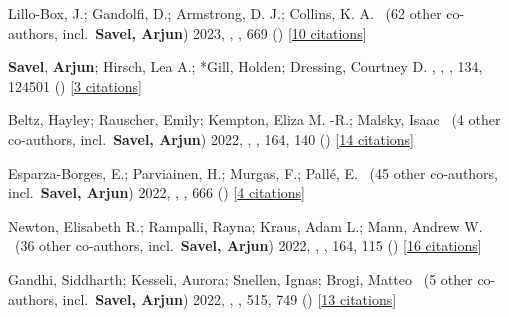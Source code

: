 \item[{\color{numcolor}\scriptsize19}] Lillo-Box, J.; Gandolfi, D.; Armstrong, D. J.; Collins, K. A. \etal\ ({62} other co-authors, incl.\ \textbf{Savel, Arjun}) 2023, , \aanda, {669} () [\href{https://ui.adsabs.harvard.edu/abs/2023A&A...669A.109L}{10 citations}]

\item[{\color{numcolor}\scriptsize18}] \textbf{Savel}, \textbf{Arjun}; Hirsch, Lea A.; *Gill, Holden; Dressing, Courtney D. , , \pasp, {134}, 124501 () [\href{https://ui.adsabs.harvard.edu/abs/2022PASP..134l4501S}{3 citations}]

\item[{\color{numcolor}\scriptsize17}] Beltz, Hayley; Rauscher, Emily; Kempton, Eliza M. -R.; Malsky, Isaac \etal\ ({4} other co-authors, incl.\ \textbf{Savel, Arjun}) 2022, , \aj, {164}, 140 () [\href{https://ui.adsabs.harvard.edu/abs/2022AJ....164..140B}{14 citations}]

\item[{\color{numcolor}\scriptsize16}] Esparza-Borges, E.; Parviainen, H.; Murgas, F.; Pall{\'e}, E. \etal\ ({45} other co-authors, incl.\ \textbf{Savel, Arjun}) 2022, , \aanda, {666} () [\href{https://ui.adsabs.harvard.edu/abs/2022A&A...666A..10E}{4 citations}]

\item[{\color{numcolor}\scriptsize15}] Newton, Elisabeth R.; Rampalli, Rayna; Kraus, Adam L.; Mann, Andrew W. \etal\ ({36} other co-authors, incl.\ \textbf{Savel, Arjun}) 2022, , \aj, {164}, 115 () [\href{https://ui.adsabs.harvard.edu/abs/2022AJ....164..115N}{16 citations}]

\item[{\color{numcolor}\scriptsize14}] Gandhi, Siddharth; Kesseli, Aurora; Snellen, Ignas; Brogi, Matteo \etal\ ({5} other co-authors, incl.\ \textbf{Savel, Arjun}) 2022, , \mnras, {515}, 749 () [\href{https://ui.adsabs.harvard.edu/abs/2022MNRAS.515..749G}{13 citations}]

